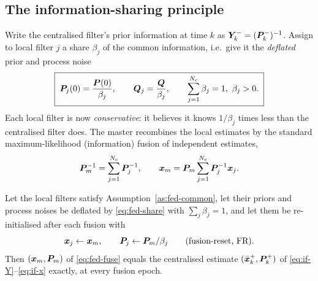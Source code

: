 \subsection{The information-sharing principle}
Write the centralised filter's prior information at time $k$ as
$\bm{Y}^-_k=(\bm{P}^{-}_k)^{-1}$. Assign to local filter $j$ a share $\beta_j$ of the common
information, i.e.\ give it the \emph{deflated} prior and process noise
\begin{equation}
\boxed{\;\bm{P}_{j}(0) = \frac{\bm{P}(0)}{\beta_j},\qquad \bm{Q}_j = \frac{\bm{Q}}{\beta_j},\qquad
\sum_{j=1}^{N_c}\beta_j = 1,\ \beta_j>0.\;}
\label{eq:fed-share}
\end{equation}
Each local filter is now \emph{conservative}: it believes it knows $1/\beta_j$ times less than the
centralised filter does. The master recombines the local estimates by the standard
maximum-likelihood (information) fusion of independent estimates,
\begin{equation}
\bm{P}_m^{-1} = \sum_{j=1}^{N_c}\bm{P}_j^{-1} ,\qquad
\bm{x}_m = \bm{P}_m\sum_{j=1}^{N_c}\bm{P}_j^{-1}\bm{x}_j .
\label{eq:fed-fuse}
\end{equation}

\begin{theorem}\label{thm:fed}
Let the local filters satisfy Assumption~\ref{as:fed-common}, let their priors and process noises
be deflated by \eqref{eq:fed-share} with $\sum_j\beta_j=1$, and let them be re-initialised after
each fusion with
\begin{equation}
\bm{x}_j \leftarrow \bm{x}_m,\qquad \bm{P}_j\leftarrow \bm{P}_m/\beta_j \qquad\text{(fusion-reset, FR)} .
\label{eq:fed-reset}
\end{equation}
Then $(\bm{x}_m,\bm{P}_m)$ of \eqref{eq:fed-fuse} equals the centralised estimate
$(\bar{\bm{x}}^+_k,\bm{P}^{+}_k)$ of \eqref{eq:if-Y}--\eqref{eq:if-x} exactly, at every fusion epoch.
\end{theorem}

